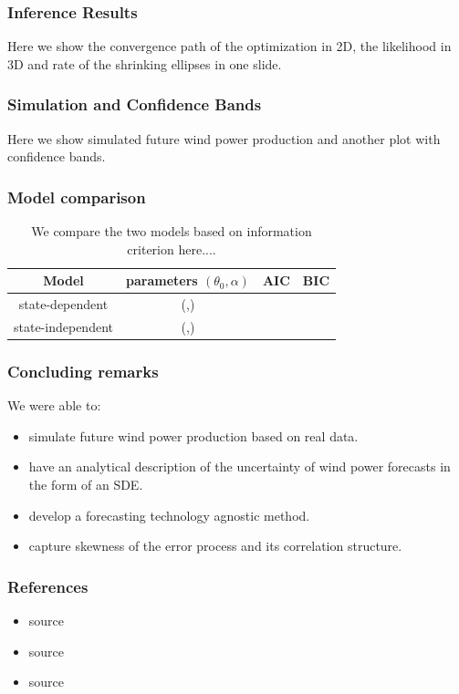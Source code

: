 \documentclass[aspectratio=169]{beamer}\usepackage[utf8]{inputenc}
\begin{document}
\begin{frame}\frametitle{Inference Results}
Here we show the convergence path of the optimization in 2D, the likelihood in 3D and rate of the shrinking ellipses in one slide.
\end{frame}

\begin{frame}\frametitle{Simulation and Confidence Bands}
Here we show simulated future wind power production and another plot with confidence bands.
\end{frame}

\begin{frame}\frametitle{Model comparison}
\begin{table}[]
\centering
\begin{tabular}{|c|c|c|c|}
\hline
Model   &  parameters $(\theta_0, \alpha)$   & AIC & BIC \\ \hline
state-dependent &   (,)  &     &      \\ \hline
state-independent &   (,)  &     &       \\ \hline
\end{tabular}
\caption{We compare the two models based on information criterion here.... }
\label{tab:model_comparison}
\end{table}
\end{frame}

\begin{frame}\frametitle{Concluding remarks}
We were able to:
\begin{itemize}
  \item simulate future wind power production based on real data.
  \item have an analytical description of the uncertainty of wind power forecasts in the form of an SDE.
  \item develop a forecasting technology agnostic method.
  \item capture skewness of the error process and its correlation structure.
\end{itemize}
\end{frame}


\begin{frame}\frametitle{References}
\begin{itemize}
  \item source
  \item source
  \item source
\end{itemize}
\end{frame}
\end{document}
